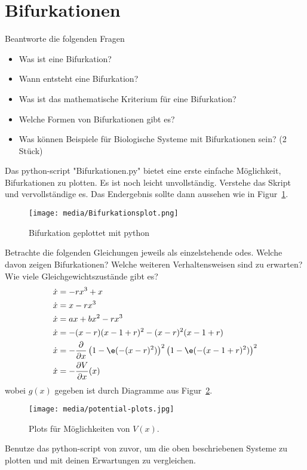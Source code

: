 \section{Bifurkationen}
Beantworte die folgenden Fragen
\begin{itemize}
    \item Was ist eine Bifurkation?
    \item Wann entsteht eine Bifurkation?
    \item Was ist das mathematische Kriterium für eine Bifurkation?
    \item Welche Formen von Bifurkationen gibt es?
    \item Was können Beispiele für Biologische Systeme mit Bifurkationen sein? (2 Stück)
\end{itemize}
%
%
Das python-script "Bifurkationen.py" bietet eine erste einfache Möglichkeit, Bifurkationen zu plotten.
Es ist noch leicht unvollständig.
Verstehe das Skript und vervollständige es.
Das Endergebnis sollte dann aussehen wie in Figur~\ref{fig:bifurcation-plot}.
\begin{figure}[!h]
    \centering
    \texttt{[image: media/Bifurkationsplot.png]}
    \caption{Bifurkation geplottet mit python}
    \label{fig:bifurcation-plot}
\end{figure}
%
%
Betrachte die folgenden Gleichungen jeweils als einzelstehende \acp{ode}. Welche davon zeigen Bifurkationen? Welche weiteren Verhaltensweisen sind zu erwarten? Wie viele Gleichgewichtszustände gibt es?
\begin{align}
    \dot{x} &= -rx^3+x\\
    \dot{x} &= x - rx^3\\
    \dot{x} &= ax + bx^2 - rx^3\\
    \dot{x} &= -(x-r)(x-1+r)^2 - (x-r)^2(x-1+r)\\
    \dot{x} &= -\frac{\partial}{\partial x}\left(1-\e(-(x-r)^2)\right)^2\left(1-\e(-(x-1+r)^2)\right)^2\\
    \dot{x} &= -\frac{\partial V}{\partial x}(x)
\end{align}
wobei $g(x)$ gegeben ist durch Diagramme aus Figur~\ref{fig:potential-plots}.
\begin{figure}[!h]
    \centering
    \texttt{[image: media/potential-plots.jpg]}
    \caption{Plots für Möglichkeiten von $V(x)$.}
    \label{fig:potential-plots}
\end{figure}
%
%
Benutze das python-script von zuvor, um die oben beschriebenen Systeme zu plotten und mit deinen Erwartungen zu vergleichen.
%
%
